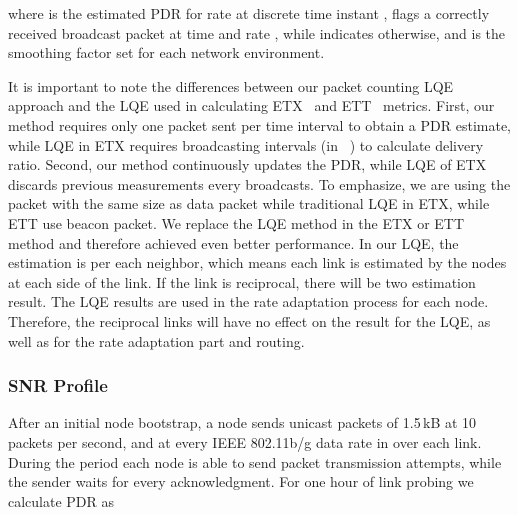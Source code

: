 \documentclass[11pt,draftclsnofoot,journal,onecolumn]{IEEEtran}
\begin{document}
where  is the estimated PDR for rate  at discrete time instant ,  flags a correctly received broadcast packet at time  and rate , while  indicates otherwise, and  is the smoothing factor set for each network environment.

It is important to note the differences between our packet counting LQE approach and the LQE used in calculating ETX~\cite[Eq. (1)]{Couto_WN_2005} and ETT~\cite{BicketMobicom2005} metrics. First, our method requires only one packet sent per time interval to obtain a PDR estimate, while LQE in ETX requires  broadcasting intervals (in~\cite{Couto_WN_2005,BicketMobicom2005} ) to calculate delivery ratio. Second, our method continuously updates the PDR, while LQE of ETX discards previous measurements every  broadcasts. To emphasize, we are using the packet with the same size as data packet while traditional LQE in ETX, while ETT use beacon packet. We replace the LQE method in the ETX or ETT method and therefore achieved even better performance. In our LQE, the estimation is per each neighbor, which means each link is estimated by the nodes at each side of the link. If the link is reciprocal, there will be two estimation result. The LQE results are used in the rate adaptation process for each node. Therefore, the reciprocal links will have no effect on the result for the LQE, as well as for the rate adaptation part and routing. 

\subsubsection{SNR Profile}
\label{sec:snr_profile}

After an initial node bootstrap, a node sends unicast packets of 1.5\,kB at 10 packets per second, and at every IEEE 802.11b/g data rate in  over each link. During the period  each node is able to send  packet transmission attempts, while the sender waits for every acknowledgment. For one hour of link probing we calculate PDR as
\end{document}
